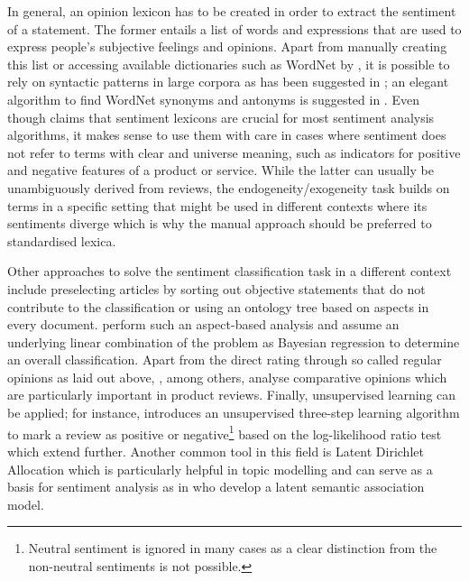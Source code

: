 In general, an opinion lexicon has to be created in order to extract the sentiment of a statement. The former entails a list of words and expressions that are used to express people's subjective feelings and opinions. Apart from manually creating this list or accessing available dictionaries such as WordNet\textsuperscript{\textregistered} by \textcite{Fellbaum.1998,Esuli.2006}, it is possible to rely on syntactic patterns in large corpora as has been suggested in \textcite{Ding.2008,Hatzivassiloglou.1997,Kanayama.2006,Turney.2002,Yu.2003}; an elegant algorithm to find WordNet\textsuperscript{\textregistered} synonyms and antonyms is suggested in \textcite{Kamps.2004}. Even though \textcite{Feldman.2013} claims that sentiment lexicons are crucial for most sentiment analysis algorithms, it makes sense to use them with care in cases where sentiment does not refer to terms with clear and universe meaning, such as indicators for positive and negative features of a product or service. While the latter can usually be unambiguously derived from reviews, the endogeneity/exogeneity task builds on terms in a specific setting that might be used in different contexts where its sentiments diverge which is why the manual approach should be preferred to standardised lexica. 

Other approaches to solve the sentiment classification task in a different context include preselecting articles by sorting out objective statements that do not contribute to the classification \parencite{Wiebe.1999} or using an ontology tree based on aspects in every document. \textcite{Wang.2010} perform such an aspect-based analysis and assume an underlying linear combination of the problem as Bayesian regression to determine an overall classification. Apart from the direct rating through so called regular opinions as laid out above, \textcite{Ding.2009,Ganapathibhotla.2008,Jindal.2006}, among others, analyse comparative opinions which are particularly important in product reviews. Finally, unsupervised learning can be applied; for instance, \textcite{Turney.2002} introduces an unsupervised three-step learning algorithm to mark a review as positive or negative\footnote{Neutral sentiment is ignored in many cases as a clear distinction from the non-neutral sentiments is not possible.} based on the log-likelihood ratio test which \textcite{Yu.2003} extend further. Another common tool in this field is Latent Dirichlet Allocation \parencite{Blei.2003} which is particularly helpful in topic modelling and can serve as a basis for sentiment analysis as in \textcite{Guo.2009} who develop a latent semantic association model.
%
